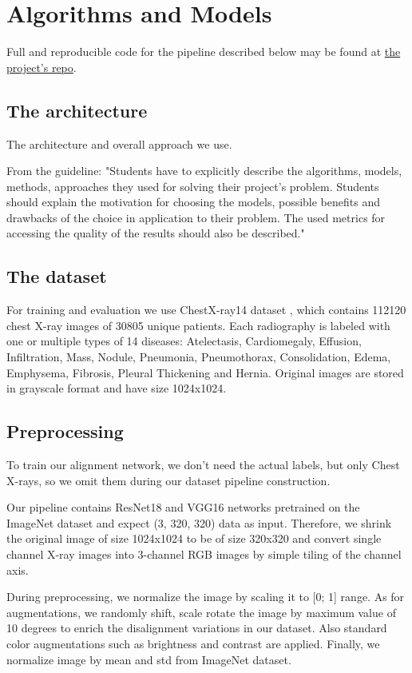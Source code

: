 \documentclass{article}
\begin{document}
\section{Algorithms and Models}\label{algorithms_and_models}
Full and reproducible code for the pipeline described below may be 
found at \href{https://github.com/bizzare-hub/Chest-Xray-alignment-using-STN.git}{the project's repo}.

\subsection{The architecture}
The architecture and overall approach we use.

From the guideline:
"Students have to explicitly describe the algorithms, models, methods, 
approaches they used for solving their project's problem. Students should 
explain the motivation for choosing the models, possible benefits and drawbacks 
of the choice in application to their problem. The used metrics for accessing 
the quality of the results should also be described."

\subsection{The dataset}
For training and evaluation we use ChestX-ray14 dataset \cite{DataSet}, which 
contains 112120 chest X-ray images of 30805 unique patients. Each radiography 
is labeled with one or multiple types of 14 diseases: Atelectasis, 
Cardiomegaly, Effusion, Infiltration, Mass, Nodule, Pneumonia, Pneumothorax, 
Consolidation, Edema, Emphysema, Fibrosis, Pleural Thickening and Hernia. 
Original images are stored in grayscale format and have size 1024x1024. 

\subsection{Preprocessing}
To train our alignment network, we don't need the actual labels, but only Chest 
X-rays, so we omit them during our dataset pipeline construction.

Our pipeline contains ResNet18 and VGG16 networks pretrained on the ImageNet 
dataset \cite{ImageNet} and expect (3, 320, 320) data as input. Therefore, we 
shrink the original image of size 1024x1024 to be of size 320x320 and convert 
single channel X-ray images into 3-channel RGB images by simple tiling of the 
channel axis.

During preprocessing, we normalize the image by scaling it to [0; 1] range. As 
for augmentations, we randomly shift, scale rotate the image by maximum value 
of 10 degrees to enrich the disalignment variations in our dataset. Also 
standard color augmentations such as brightness and contrast are applied. 
Finally, we normalize image by mean and std from ImageNet dataset.
\end{document}
